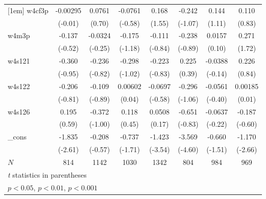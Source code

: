 {\begin{tabular}{l*{7}{c}}
[1em]
w4cf3p      &    -0.00295         &      0.0761         &     -0.0761         &       0.168         &      -0.242         &       0.144         &       0.110         \\
            &     (-0.01)         &      (0.70)         &     (-0.58)         &      (1.55)         &     (-1.07)         &      (1.11)         &      (0.83)         \\
[1em]
w4m3p       &      -0.137         &     -0.0324         &      -0.175         &      -0.111         &      -0.238         &      0.0157         &       0.271         \\
            &     (-0.52)         &     (-0.25)         &     (-1.18)         &     (-0.84)         &     (-0.89)         &      (0.10)         &      (1.72)         \\
[1em]
w4s121      &      -0.360         &      -0.236         &      -0.298         &      -0.223         &       0.225         &     -0.0388         &       0.226         \\
            &     (-0.95)         &     (-0.82)         &     (-1.02)         &     (-0.83)         &      (0.39)         &     (-0.14)         &      (0.84)         \\
[1em]
w4s122      &      -0.206         &      -0.109         &     0.00602         &     -0.0697         &      -0.296         &     -0.0561         &     0.00185         \\
            &     (-0.81)         &     (-0.89)         &      (0.04)         &     (-0.58)         &     (-1.06)         &     (-0.40)         &      (0.01)         \\
[1em]
w4s126      &       0.195         &      -0.372         &       0.118         &      0.0508         &      -0.651         &     -0.0637         &      -0.187         \\
            &      (0.59)         &     (-1.00)         &      (0.45)         &      (0.17)         &     (-0.83)         &     (-0.22)         &     (-0.60)         \\
[1em]
\_cons      &      -1.835\sym{**} &      -0.208         &      -0.737         &      -1.423\sym{***}&      -3.569\sym{***}&      -0.660         &      -1.170\sym{**} \\
            &     (-2.61)         &     (-0.57)         &     (-1.71)         &     (-3.54)         &     (-4.60)         &     (-1.51)         &     (-2.66)         \\
\hline
\(N\)       &         814         &        1142         &        1030         &        1342         &         804         &         984         &         969         \\
\hline\hline
\multicolumn{8}{l}{\footnotesize \textit{t} statistics in parentheses}\\
\multicolumn{8}{l}{\footnotesize \sym{*} \(p<0.05\), \sym{**} \(p<0.01\), \sym{***} \(p<0.001\)}\\
\end{tabular}
}
